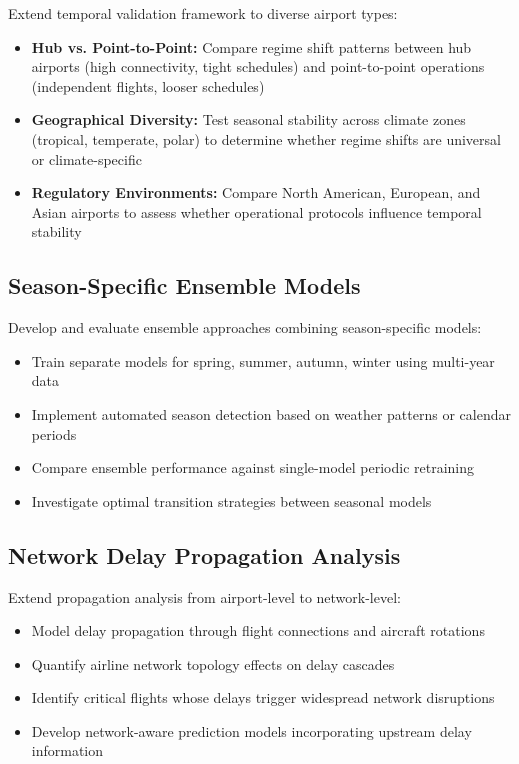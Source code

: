 \documentclass{report}
\begin{document}
Extend temporal validation framework to diverse airport types:
\begin{itemize}
    \item \textbf{Hub vs. Point-to-Point:} Compare regime shift patterns between hub airports (high connectivity, tight schedules) and point-to-point operations (independent flights, looser schedules)
    \item \textbf{Geographical Diversity:} Test seasonal stability across climate zones (tropical, temperate, polar) to determine whether regime shifts are universal or climate-specific
    \item \textbf{Regulatory Environments:} Compare North American, European, and Asian airports to assess whether operational protocols influence temporal stability
\end{itemize}

\subsection{Season-Specific Ensemble Models}

Develop and evaluate ensemble approaches combining season-specific models:
\begin{itemize}
    \item Train separate models for spring, summer, autumn, winter using multi-year data
    \item Implement automated season detection based on weather patterns or calendar periods
    \item Compare ensemble performance against single-model periodic retraining
    \item Investigate optimal transition strategies between seasonal models
\end{itemize}

\subsection{Network Delay Propagation Analysis}

Extend propagation analysis from airport-level to network-level:
\begin{itemize}
    \item Model delay propagation through flight connections and aircraft rotations
    \item Quantify airline network topology effects on delay cascades
    \item Identify critical flights whose delays trigger widespread network disruptions
    \item Develop network-aware prediction models incorporating upstream delay information
\end{itemize}
\end{document}
